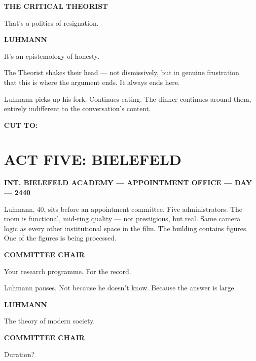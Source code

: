 \documentclass[12pt]{article}
\newcommand{\sceneheading}[1]{%
  \vspace{10pt}%
  \noindent\textbf{#1}%
  \vspace{6pt}%
}
\newcommand{\trans}[1]{%
  \vspace{8pt}%
  \begin{flushright}\textbf{#1}\end{flushright}%
  \vspace{4pt}%
}
\newcommand{\character}[1]{%
  \vspace{8pt}%
  \begin{center}\textbf{#1}\end{center}%
  \vspace{-4pt}%
}
\newenvironment{dialogue}{%
  \begin{center}%
  \begin{minipage}{0.62\textwidth}%
}{%
  \end{minipage}%
  \end{center}%
  \vspace{4pt}%
}
\newenvironment{action}{%
  \vspace{4pt}%
  \noindent\ignorespaces%
}{%
  \vspace{6pt}%
}
\begin{document}
\character{THE CRITICAL THEORIST}
\begin{dialogue}
That's a politics of resignation.
\end{dialogue}

\character{LUHMANN}
\begin{dialogue}
It's an epistemology of honesty.
\end{dialogue}

\begin{action}
The Theorist shakes their head — not dismissively, but in genuine frustration that this is where the argument ends. It always ends here.

Luhmann picks up his fork. Continues eating. The dinner continues around them, entirely indifferent to the conversation's content.
\end{action}

\trans{CUT TO:}


\section*{ACT FIVE: BIELEFELD}

\sceneheading{INT. BIELEFELD ACADEMY — APPOINTMENT OFFICE — DAY — 2440}

\begin{action}
Luhmann, 40, sits before an appointment committee. Five administrators. The room is functional, mid-ring quality — not prestigious, but real. Same camera logic as every other institutional space in the film. The building contains figures. One of the figures is being processed.
\end{action}

\character{COMMITTEE CHAIR}
\begin{dialogue}
Your research programme. For the record.
\end{dialogue}

\begin{action}
Luhmann pauses. Not because he doesn't know. Because the answer is large.
\end{action}

\character{LUHMANN}
\begin{dialogue}
The theory of modern society.
\end{dialogue}

\character{COMMITTEE CHAIR}
\begin{dialogue}
Duration?
\end{dialogue}
\end{document}
